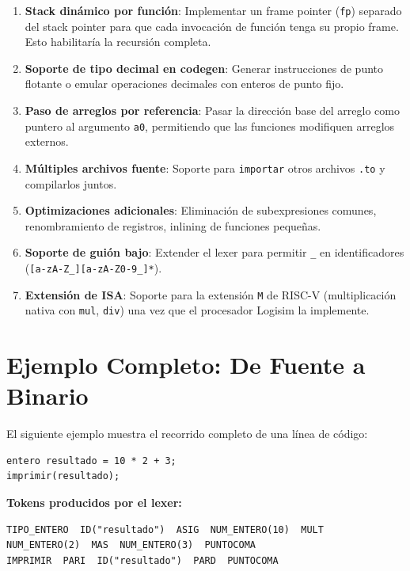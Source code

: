 \begin{enumerate}
    \item \textbf{Stack dinámico por función}: Implementar un frame pointer (\texttt{fp}) separado del stack pointer para que cada invocación de función tenga su propio frame. Esto habilitaría la recursión completa.
    
    \item \textbf{Soporte de tipo decimal en codegen}: Generar instrucciones de punto flotante o emular operaciones decimales con enteros de punto fijo.
    
    \item \textbf{Paso de arreglos por referencia}: Pasar la dirección base del arreglo como puntero al argumento \texttt{a0}, permitiendo que las funciones modifiquen arreglos externos.
    
    \item \textbf{Múltiples archivos fuente}: Soporte para \texttt{importar} otros archivos \texttt{.to} y compilarlos juntos.
    
    \item \textbf{Optimizaciones adicionales}: Eliminación de subexpresiones comunes, renombramiento de registros, inlining de funciones pequeñas.
    
    \item \textbf{Soporte de guión bajo}: Extender el lexer para permitir \texttt{\_} en identificadores (\texttt{[a-zA-Z\_][a-zA-Z0-9\_]*}).
    
    \item \textbf{Extensión de ISA}: Soporte para la extensión \texttt{M} de RISC-V (multiplicación nativa con \texttt{mul}, \texttt{div}) una vez que el procesador Logisim la implemente.
\end{enumerate}

\section{Ejemplo Completo: De Fuente a Binario}

El siguiente ejemplo muestra el recorrido completo de una línea de código:

\begin{lstlisting}[style=tppstyle, caption={Código fuente TPP}]
entero resultado = 10 * 2 + 3;
imprimir(resultado);
\end{lstlisting}

\textbf{Tokens producidos por el lexer:}
\begin{verbatim}
TIPO_ENTERO  ID("resultado")  ASIG  NUM_ENTERO(10)  MULT  
NUM_ENTERO(2)  MAS  NUM_ENTERO(3)  PUNTOCOMA
IMPRIMIR  PARI  ID("resultado")  PARD  PUNTOCOMA
\end{verbatim}

